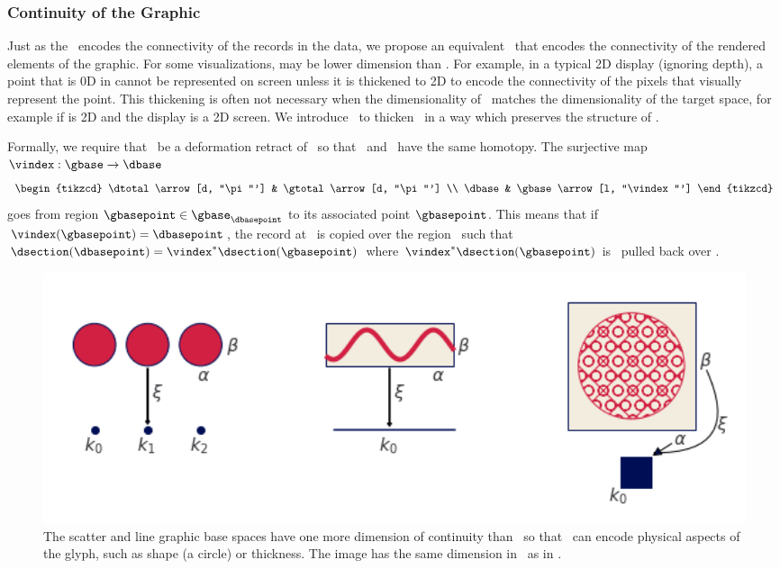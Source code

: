 \documentclass[../main.tex]{subfiles}
\begin{document}
\subsubsection{Continuity of the Graphic \gbase} 
\label{sec:graphic_base}
Just as the \dbase\ encodes the connectivity of the records in the data, we propose an equivalent \gbase\ that encodes the connectivity of the rendered elements of the graphic. For some visualizations, \dbase may be lower dimension than \gbase. For example, in a typical 2D display (ignoring depth), a point that is 0D in \dbase cannot be represented on screen unless it is thickened to 2D to encode the connectivity of the pixels that visually represent the point. This thickening is often not necessary when the dimensionality of \dbase\ matches the dimensionality of the target space, for example if \dbase is 2D and the display is a 2D screen. We introduce \gbase\ to thicken \dbase\ in a way which preserves the structure of \dbase. 

Formally, we require that \dbase\ be a deformation retract\cite{RetractionTopology2020} of \gbase\ so that \dbase\ and \gbase\ have the same homotopy. The surjective map $\vindex: \gbase \rightarrow \dbase$ 
\begin{equation}
    \begin{tikzcd}
        \dtotal \arrow[d, "\pi"'] & \gtotal \arrow[d, "\pi"'] \\
        \dbase                   & \gbase \arrow[l, "\vindex"']
    \end{tikzcd}
\end{equation}
goes from region $\gbasepoint \in \gbase_{\dbasepoint}$ to its associated point $\gbasepoint$. This means that if $\vindex(\gbasepoint) = \dbasepoint$, the record at \dbasepoint\ is copied over the region \gbasepoint\ such that $\dsection(\dbasepoint)=\vindex^*\dsection(\gbasepoint)$ where $\vindex^*\dsection(\gbasepoint)$  is \dsection\ pulled back over \gbase. 

\begin{figure}
    \includegraphics[width=1\textwidth]{figures/math/retraction_maps.png}
    \caption{The scatter and line graphic base spaces have one more dimension of continuity than \dbase\ so that \gbase\ can encode physical aspects of the glyph, such as shape (a circle) or thickness. The image has the same dimension in \gbase\ as in \dbase.}
    \label{fig:graphic_retraction_map}
\end{figure}
\end{document}
